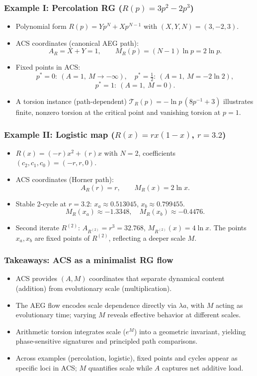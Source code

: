 \documentclass[aspectratio=169]{beamer}
\begin{document}
\begin{frame}
    \frametitle{Example I: Percolation RG ($R(p) = 3p^2 - 2p^3$)}
    \begin{itemize}
        \item Polynomial form $R(p)=Yp^N+Xp^{N-1}$ with $(X,Y,N)=(3,-2,3)$.
        \item ACS coordinates (canonical AEG path):
        \[
            A_R = X+Y = 1,\qquad M_R(p) = (N-1)\ln p = 2\ln p.
        \]
        \item Fixed points in ACS:
        \[
            p^*=0:\ (A=1,\ M\to -\infty),\quad
            p^*=\tfrac12:\ (A=1,\ M=-2\ln 2),
        \]
        \[
            p^*=1:\ (A=1,\ M=0).
        \]
        \item A torsion instance (path-dependent) $\mathcal{T}_R(p) = -\ln p\,(8p^{-1}+3)$ illustrates finite, nonzero torsion at the critical point and vanishing torsion at $p=1$.
    \end{itemize}
\end{frame}

\begin{frame}
    \frametitle{Example II: Logistic map ($R(x)=rx(1-x)$, $r=3.2$)}
    \begin{itemize}
        \item $R(x)=(-r)x^2+(r)x$ with $N=2$, coefficients $(c_2,c_1,c_0)=(-r,r,0)$.
        \item ACS coordinates (Horner path):
        \[
            A_R(r)=r,\qquad M_R(x)=2\ln x.
        \]
        \item Stable 2-cycle at $r=3.2$: $x_a\approx 0.513045$, $x_b\approx 0.799455$.
        \[
            M_R(x_a)\approx -1.3348,\quad M_R(x_b)\approx -0.4476.
        \]
        \item Second iterate $R^{(2)}$: $A_{R^{(2)}}=r^3=32.768$, $M_{R^{(2)}}(x)=4\ln x$. The points $x_a,x_b$ are fixed points of $R^{(2)}$, reflecting a deeper scale $M$.
    \end{itemize}
\end{frame}

\begin{frame}
    \frametitle{Takeaways: ACS as a minimalist RG flow}
    \begin{itemize}
        \item ACS provides $(A,M)$ coordinates that separate dynamical content (addition) from evolutionary scale (multiplication).
        \item The AEG flow encodes scale dependence directly via $\lambda a$, with $M$ acting as evolutionary time; varying $M$ reveals effective behavior at different scales.
        \item Arithmetic torsion integrates scale ($e^M$) into a geometric invariant, yielding phase-sensitive signatures and principled path comparisons.
        \item Across examples (percolation, logistic), fixed points and cycles appear as specific loci in ACS; $M$ quantifies scale while $A$ captures net additive load.
    \end{itemize}
\end{frame}
\end{document}
